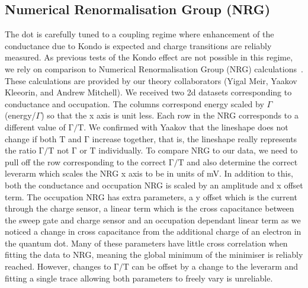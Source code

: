 \subsection{Numerical Renormalisation Group (NRG)}
The dot is carefully tuned to a coupling regime where enhancement of the conductance due to Kondo is expected and charge transitions are reliably measured. As previous tests of the Kondo effect are not possible in this regime, we rely on comparison to Numerical Renormalisation Group (NRG) calculations~\cite{nrg}. These calculations are provided by our theory collaborators (Yigal Meir, Yaakov Kleeorin, and Andrew Mitchell). 
We received two 2d datasets corresponding to conductance and occupation. The columns correspond energy scaled by $\Gamma$ (energy/$\Gamma$) so that the x axis is unit less. Each row in the NRG corresponds to a different value of $\mathrm{\Gamma/T}$.  We confirmed with Yaakov that the lineshape does not change if both $\mathrm{T}$ and $\mathrm{\Gamma}$ increase together, that is, the lineshape really represents the ratio $\mathrm{\Gamma/T}$ not $\mathrm{\Gamma}$ or $\mathrm{T}$ individually.
To compare NRG to our data, we need to pull off the row corresponding to the correct $\mathrm{\Gamma/T}$ and also determine the correct leverarm which scales the NRG x axis to be in units of mV. In addition to this, both the conductance and occupation NRG is scaled by an amplitude and x offset term. The occupation NRG has extra parameters, a y offset which is the current through the charge sensor, a linear term which is the cross capacitance between the sweep gate and charge sensor and an occupation dependant linear term as we noticed a change in cross capacitance from the additional charge of an electron in the quantum dot. Many of these parameters have little cross correlation when fitting the data to NRG, meaning the global minimum of the minimiser is reliably reached. However, changes to $\mathrm{\Gamma/T}$ can be offset by a change to the leverarm and fitting a single trace allowing both parameters to freely vary is unreliable. 

